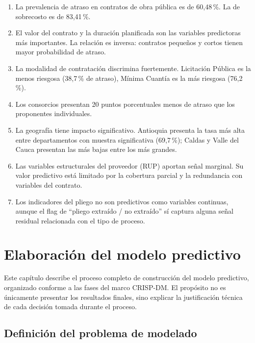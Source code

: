 \documentclass[12pt,letterpaper,oneside]{report}
\begin{document}
\begin{enumerate}
    \item La prevalencia de atraso en contratos de obra pública es de
    60,48\,\%. La de sobrecosto es de 83,41\,\%.
    \item El valor del contrato y la duración planificada son las variables
    predictoras más importantes. La relación es inversa: contratos pequeños y
    cortos tienen mayor probabilidad de atraso.
    \item La modalidad de contratación discrimina fuertemente. Licitación
    Pública es la menos riesgosa (38,7\,\% de atraso), Mínima Cuantía es la
    más riesgosa (76,2\,\%).
    \item Los consorcios presentan 20 puntos porcentuales menos de atraso que
    los proponentes individuales.
    \item La geografía tiene impacto significativo. Antioquia presenta la tasa
    más alta entre departamentos con muestra significativa (69,7\,\%); Caldas
    y Valle del Cauca presentan las más bajas entre los más grandes.
    \item Las variables estructurales del proveedor (RUP) aportan señal
    marginal. Su valor predictivo está limitado por la cobertura parcial y la
    redundancia con variables del contrato.
    \item Los indicadores del pliego no son predictivos como variables
    continuas, aunque el flag de ``pliego extraído / no extraído'' sí captura
    alguna señal residual relacionada con el tipo de proceso.
\end{enumerate}

\chapter{Elaboración del modelo predictivo}
\label{cap:modelo}

Este capítulo describe el proceso completo de construcción del modelo
predictivo, organizado conforme a las fases del marco CRISP-DM. El propósito
no es únicamente presentar los resultados finales, sino explicar la
justificación técnica de cada decisión tomada durante el proceso.

\section{Definición del problema de modelado}
\end{document}
